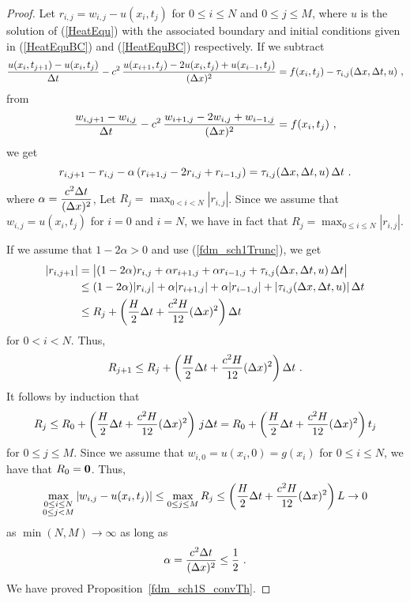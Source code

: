 \begin{proof}
Let $r_{i,j} = w_{i,j} - u(x_i,t_j)$ for $0\leq i \leq N$ and
$0 \leq j \leq M$, where $u$ is the solution of (\ref{HeatEqu})
with the associated boundary and initial conditions given in
(\ref{HeatEquBC}) and (\ref{HeatEquBC}) respectively.
If we subtract
\[
\frac{u(x_i,t_{j+1}) - u(x_i,t_j)}{\Delta{t}}
- c^2\, \frac{u(x_{i+1},t_j) - 2u(x_i,t_j) + u(x_{i-1},t_j)}{(\Delta{x})^2} = 
f(x_i,t_j) - \tau_{i,j}(\Delta{x},\Delta{t},u) \ ,
\]
from
\[
\frac{w_{i,j+1} - w_{i,j}}{\Delta{t}}  - c^2\, \frac{w_{i+1,j} - 2w_{i,j} +
w_{i-1,j}}{(\Delta{x})^2} = f(x_i,t_j) \ ,
\]
we get
\[
r_{i,j+1} - r_{i,j} - \alpha \left( r_{i+1,j} - 2 r_{i,j}  + r_{i-1,j} \right)
= \tau_{i,j}(\Delta{x},\Delta{t},u) \, \Delta{t} \ .
\]
where $\displaystyle \alpha = \frac{c^2\Delta{t}}{(\Delta{x})^2}$,  Let
$\displaystyle R_j = \max_{0 < i < N}|r_{i,j}|$.  Since we assume that
$w_{i,j} = u(x_i,t_j)$ for $i=0$ and $i=N$, we have in fact that
$\displaystyle R_j = \max_{0 \leq i \leq N}|r_{i,j}|$.

If we assume that $1 - 2\alpha >0$ and use (\ref{fdm_sch1Trunc}), we
get
\begin{align*}
|r_{i,j+1}| &= \big| (1-2\alpha) r_{i,j} + \alpha r_{i+1,j} + \alpha
  r_{i-1,j} + \tau_{i,j}(\Delta{x},\Delta{t},u) \, \Delta{t} \big| \\
&\leq (1-2\alpha) |r_{i,j}| + \alpha |r_{i+1,j}| + \alpha
  |r_{i-1,j}| + |\tau_{i,j}(\Delta{x},\Delta{t},u)| \, \Delta{t} \\
&\leq R_j + \left(\frac{H}{2} \Delta{t} + \frac{c^2 H}{12} (\Delta{x})^2 \right)
\Delta{t}
\end{align*}
for $0 < i < N$.  Thus,
\[
R_{j+1} \leq R_j + \left(\frac{H}{2} \Delta{t} + \frac{c^2 H}{12}
(\Delta{x})^2 \right) \Delta{t} \ .
\]
It follows by induction that
\[
R_j \leq R_0 + \left(\frac{H}{2} \Delta{t} + \frac{c^2 H}{12}
  (\Delta{x})^2 \right) \, j \Delta{t}
= R_0 + \left(\frac{H}{2} \Delta{t} + \frac{c^2 H}{12}
  (\Delta{x})^2 \right) t_j
\]
for $0\leq j \leq M$.
Since we assume that $w_{i,0} = u(x_i,0) = g(x_i)$ for $0\leq i \leq N$,
we have that $R_0 = \mathbf{0}$.  Thus,
\[
\max_{\substack{0\leq i\leq N\\0 \leq j <M}} |w_{i,j} - u(x_i,t_j) |
\leq \max_{0 \leq j \leq M} R_j
\leq \left(\frac{H}{2} \Delta{t} + \frac{c^2 H}{12}
(\Delta{x})^2 \right) L \to 0
\]
as $\min(N,M) \to \infty$ as long as
\begin{equation} \label{fdm_sch1Cond}
\alpha = \frac{c^2\Delta{t}}{(\Delta{x})^2} \leq \frac{1}{2} \ .
\end{equation}
We have proved Proposition~\ref{fdm_sch1S_convTh}.
\end{proof}

